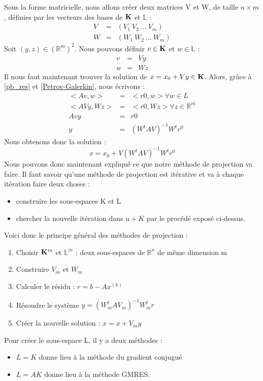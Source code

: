 Sous la forme matricielle, nous allons créer deux matrices V et W, de taille $n \times m$,  définies par les vecteurs des bases de $\mathbf{K}$ et $\mathbb{L}$ : 
\begin{eqnarray}
V &=& (V_1 \ V_2 \ ... \ V_m ) \\
W &=& (W_1 \ W_2 \ ... \ W_m )
\end{eqnarray}
Soit $(y, z) \in (\mathbb{R}^m)^2$. Nous pouvons définir $v \in \mathbf{K}$ et $w \in \mathbb{L}$ :
\begin{eqnarray}
v &=& Vy\\
w &=& Wz
\end{eqnarray}
Il nous faut maintenant trouver la solution de $ x = x_0 + Vy \in \mathbf{K}$. Alors, grâce à \ref{pb_res} et \ref{Petrov-Galerkin}, nous écrivons : 
\begin{eqnarray}
<Av, w> &=& <r0, w> \forall w \in L\\
<AVy, Wz> &=& <r0, Wz> \forall z \in \mathbb{R}^m \\
Avy &=& r0 \\
y &=& (W^t A V)^{-1} W^tr^0
\end{eqnarray}
Nous obtenons donc la solution : 
\begin{equation}
x = x_0 + V (W^t A V)^{-1} W^tr^0
\end{equation}
Nous pouvons donc maintenant expliqué ce que notre méthode de projection va faire. Il faut savoir qu'une méthode de projection est itérative et va à chaque itération faire deux choses  :
\begin{itemize}
	\item construire les sous-espaces K et L
	\item chercher la nouvelle itération dans $u + K$ par le procédé exposé ci-dessus.
\end{itemize}
Voici donc le principe général des méthodes de projection : 
\begin{enumerate}
	\item Choisir $\mathbf{K}^m$ et $\mathbb{L}^m$ : deux sous-espaces de $\mathbb{R}^n$ de même dimension m
	\item Construire $V_m$ et $W_m$
	\item Calculer le résidu : $r = b - Ax^{(k)}$
	\item Résoudre le système $y = (W^t_m A V_m)^{-1} W^t_mr$
	\item Créer la nouvelle solution : $x = x + V_m y$
\end{enumerate}
Pour créer le sous-espace L, il y a deux méthodes : 
\begin{itemize}
	\item $L = K$ donne lieu à la méthode du gradient conjugué
	\item $L = AK$ donne lieu à la méthode GMRES.
\end{itemize}
